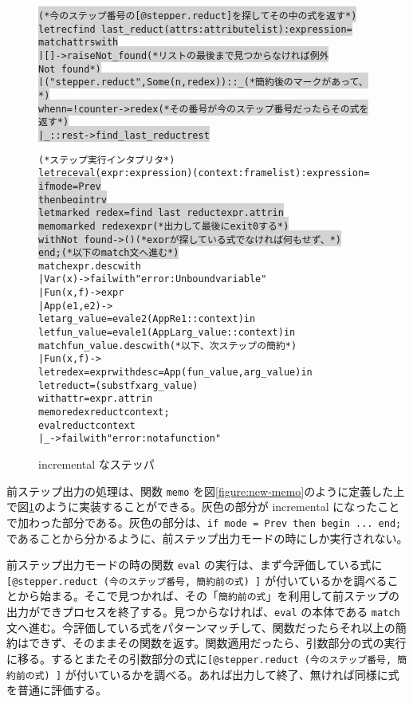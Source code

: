 \begin{figure}
\begin{alltt}
\colorbox{lightgray}{ (* 今のステップ番号の [@stepper.reduct] を探してその中の式を返す *)}
\colorbox{lightgray}{let rec find\_last\_reduct (attrs : attribute list) : expression =}
\colorbox{lightgray}{  match attrs with}
\colorbox{lightgray}{  | [] -> raise Not\_found      (* リストの最後まで見つからなければ例外 Not\_found *)}
\colorbox{lightgray}{  | ("stepper.reduct", Some (n, redex)) :: \_        (* 簡約後のマークがあって、 *)}
\colorbox{lightgray}{    when n = !counter -> redex (* その番号が今のステップ番号だったらその式を返す *)}
\colorbox{lightgray}{  | \_ :: rest -> find\_last\_reduct rest}

(* ステップ実行インタプリタ *)
let rec eval (expr : expression) (context : frame list) : expression =
\colorbox{lightgray}{  if mode = Prev}
\colorbox{lightgray}{  then begin try}
\colorbox{lightgray}{      let marked\_redex = find\_last\_reduct expr.attr in}
\colorbox{lightgray}{      memo marked\_redex expr                     (* 出力して最後に exit 0 する *)}
\colorbox{lightgray}{    with Not\_found -> ()             (* expr が探している式でなければ何もせず、 *)}
\colorbox{lightgray}{  end;                                               (* 以下の match 文へ進む *)}
  match expr.desc with
  | Var (x) -> failwith "error: Unbound variable"
  | Fun (x, f) -> expr
  | App (e1, e2) ->
    let arg\_value = eval e2 (AppR e1 :: context) in
    let fun\_value = eval e1 (AppL arg\_value :: context) in
    match fun\_value.desc with                          (* 以下、次ステップの簡約 *)
    | Fun (x, f) ->
      let redex = {expr with desc = App (fun\_value, arg\_value)} in
      let reduct = {(subst f x arg\_value)
                    with attr = expr.attr} in
      memo redex reduct context;
      eval reduct context
    | \_ -> failwith "error: not a function"
\end{alltt}
\caption{incremental なステッパ}
\label{figure:new-stepper}
\end{figure}

前ステップ出力の処理は、関数 \texttt{memo} を図\ref{figure:new-memo}のように定義した上で図\ref{figure:new-stepper}のように実装することができる。灰色の部分が incremental になったことで加わった部分である。灰色の部分は、\texttt{if mode = Prev then begin ... end;} であることから分かるように、前ステップ出力モードの時にしか実行されない。

前ステップ出力モードの時の関数 \texttt{eval} の実行は、まず今評価している式に \texttt{[@stepper.reduct (今のステップ番号, 簡約前の式) ]} が付いているかを調べることから始まる。そこで見つかれば、その「\texttt{簡約前の式}」を利用して前ステップの出力ができプロセスを終了する。見つからなければ、\texttt{eval} の本体である \texttt{match} 文へ進む。今評価している式をパターンマッチして、関数だったらそれ以上の簡約はできず、そのままその関数を返す。関数適用だったら、引数部分の式の実行に移る。するとまたその引数部分の式に\texttt{[@stepper.reduct (今のステップ番号, 簡約前の式) ]} が付いているかを調べる。あれば出力して終了、無ければ同様に式を普通に評価する。

